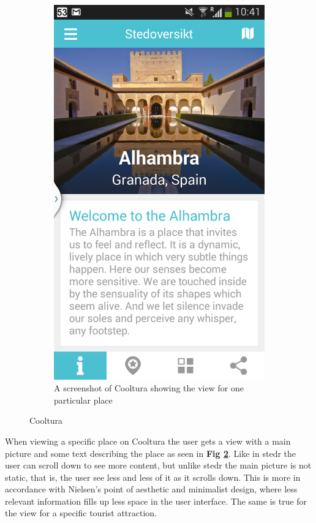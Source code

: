 \begin{figure}
\begin{subfigure}[h]{0.4\textwidth}
		\includegraphics[width=\textwidth]{fig/cooltura_screenshot2}
		\caption{A screenshot of Cooltura showing the view for one particular place}
		\label{cooltura_screenshot2}
	\end{subfigure}
	\caption{Cooltura}
\end{figure}

When viewing a specific place on Cooltura the user gets a view with a main picture and some text describing the place as seen in \textbf{Fig \ref{cooltura_screenshot2}}. Like in stedr the user can scroll down to see more content, but unlike stedr the main picture is not static, that is, the user see less and less of it as it scrolls down. This is more in accordance with Nielsen’s point of aesthetic and minimalist design, where less relevant information fills up less space in the user interface. The same is true for the view for a specific tourist attraction. \newline

